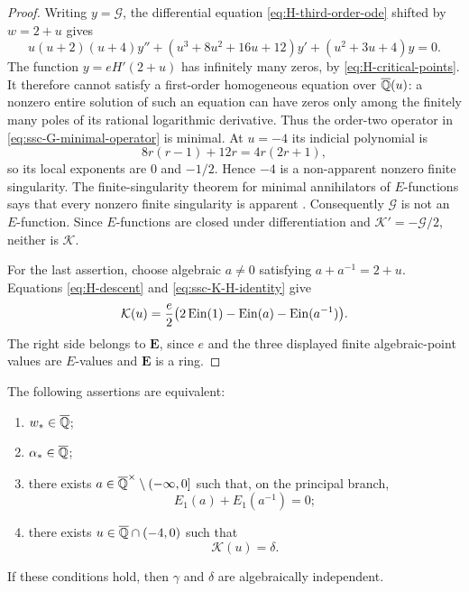 \begin{proof}
Writing \(y=\mathcal G\), the differential equation
\eqref{eq:H-third-order-ode} shifted by \(w=2+u\) gives
\begin{equation}\label{eq:ssc-G-minimal-operator}
 u(u+2)(u+4)y''
 +(u^3+8u^2+16u+12)y'
 +(u^2+3u+4)y=0.
\end{equation}
The function \(y=eH'(2+u)\) has infinitely many zeros, by
\eqref{eq:H-critical-points}.  It therefore cannot satisfy a first-order
homogeneous equation over \(\overline{\mathbb Q}(u)\): a nonzero entire solution of such an
equation can have zeros only among the finitely many poles of its rational
logarithmic derivative.  Thus the order-two operator in
\eqref{eq:ssc-G-minimal-operator} is minimal.  At \(u=-4\) its indicial
polynomial is
\[
 8r(r-1)+12r=4r(2r+1),
\]
so its local exponents are \(0\) and \(-1/2\).  Hence \(-4\) is a
non-apparent nonzero finite singularity.  The finite-singularity theorem for
minimal annihilators of \(E\)-functions says that every nonzero finite
singularity is apparent \cite{Andre2000}.  Consequently
\(\mathcal G\) is not an \(E\)-function.  Since \(E\)-functions are closed
under differentiation and \(\mathcal K'=-\mathcal G/2\), neither is
\(\mathcal K\).

For the last assertion, choose algebraic \(a\ne0\) satisfying
\(a+a^{-1}=2+u\).  Equations \eqref{eq:H-descent} and
\eqref{eq:ssc-K-H-identity} give
\begin{equation}\label{eq:ssc-K-finite-E-values}
 \mathcal K(u)=\frac e2
 \bigl(2\operatorname{Ein}(1)-\operatorname{Ein}(a)-\operatorname{Ein}(a^{-1})\bigr).
\end{equation}
The right side belongs to \(\mathbf E\), since \(e\) and the three displayed
finite algebraic-point values are \(E\)-values and \(\mathbf E\) is a ring.
\end{proof}

\begin{proposition}
\label{prop:ssc-euler-equivalences}
The following assertions are equivalent:
\begin{enumerate}[label=\textup{(\roman*)}]
 \item \(w_*\in\overline{\mathbb Q}\);
 \item \(\alpha_*\in\overline{\mathbb Q}\);
 \item there exists
       \(a\in\overline{\mathbb Q}^\times\setminus(-\infty,0]\) such that, on the
       principal branch,
       \[
        E_1(a)+E_1(a^{-1})=0;
       \]
 \item there exists \(u\in\overline{\mathbb Q}\cap(-4,0)\) such that
       \[
        \mathcal K(u)=\delta.
       \]
\end{enumerate}
If these conditions hold, then \(\gamma\) and \(\delta\) are
algebraically independent.
\end{proposition}

